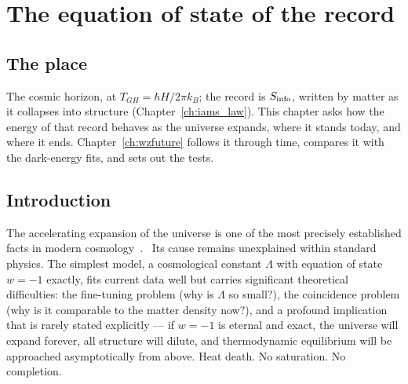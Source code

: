 \chapter{The equation of state of the record}\label{ch:darkenergy}

\section*{The place}
The cosmic horizon, at $T_{GH}=\hbar H/2\pi k_B$; the record is $S_{\rm info}$, written by matter as it collapses into structure
(Chapter~\ref{ch:iams_law}). This chapter asks how the energy of that record behaves as the universe expands, where it stands today, and
where it ends. Chapter~\ref{ch:wzfuture} follows it through time, compares it with the dark-energy fits, and sets out the tests.

\section{Introduction}\label{sec:de_intro}
The accelerating expansion of the universe is one of the most precisely established facts in modern cosmology~\cite{Riess1998,Perlmutter1999,Planck2018VI}.
\observed\ Its cause remains unexplained within standard physics. The simplest model, a cosmological constant $\Lambda$ with equation of state
$w=-1$ exactly, fits current data well but carries significant theoretical difficulties: the fine-tuning problem (why is $\Lambda$ so small?), the
coincidence problem (why is it comparable to the matter density now?), and a profound implication that is rarely stated explicitly --- if $w=-1$
is eternal and exact, the universe will expand forever, all structure will dilute, and thermodynamic equilibrium will be approached
asymptotically from above. Heat death. No saturation. No completion.

